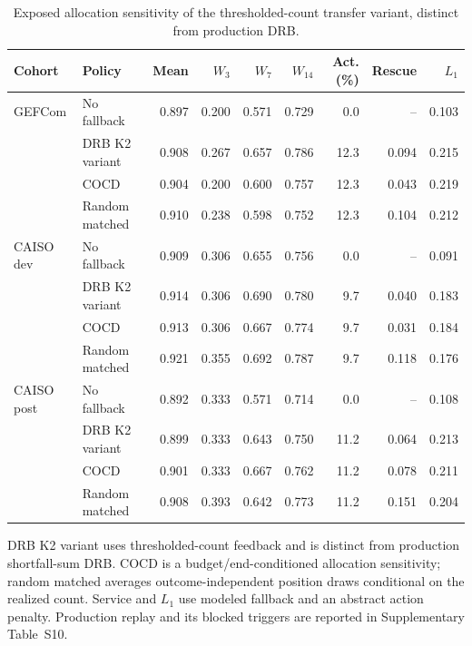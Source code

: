 
\begin{table}[!tbp]
\centering
\caption{Exposed allocation sensitivity of the thresholded-count
transfer variant, distinct from production DRB.}
\label{tab:transfer}
\scriptsize
\setlength{\tabcolsep}{2.5pt}
\begin{tabular}{llrrrrrrr}
\toprule
Cohort & Policy & Mean & $W_3$ & $W_7$ & $W_{14}$ & Act. (\%) & Rescue & $L_1$ \\
\midrule
GEFCom & No fallback & 0.897 & 0.200 & 0.571 & 0.729 & 0.0 & -- & 0.103 \\
 & DRB K2 variant & 0.908 & 0.267 & 0.657 & 0.786 & 12.3 & 0.094 & 0.215 \\
 & COCD & 0.904 & 0.200 & 0.600 & 0.757 & 12.3 & 0.043 & 0.219 \\
 & Random matched & 0.910 & 0.238 & 0.598 & 0.752 & 12.3 & 0.104 & 0.212 \\
\addlinespace[2pt]
CAISO dev & No fallback & 0.909 & 0.306 & 0.655 & 0.756 & 0.0 & -- & 0.091 \\
 & DRB K2 variant & 0.914 & 0.306 & 0.690 & 0.780 & 9.7 & 0.040 & 0.183 \\
 & COCD & 0.913 & 0.306 & 0.667 & 0.774 & 9.7 & 0.031 & 0.184 \\
 & Random matched & 0.921 & 0.355 & 0.692 & 0.787 & 9.7 & 0.118 & 0.176 \\
\addlinespace[2pt]
CAISO post & No fallback & 0.892 & 0.333 & 0.571 & 0.714 & 0.0 & -- & 0.108 \\
 & DRB K2 variant & 0.899 & 0.333 & 0.643 & 0.750 & 11.2 & 0.064 & 0.213 \\
 & COCD & 0.901 & 0.333 & 0.667 & 0.762 & 11.2 & 0.078 & 0.211 \\
 & Random matched & 0.908 & 0.393 & 0.642 & 0.773 & 11.2 & 0.151 & 0.204 \\
\bottomrule
\end{tabular}
\par\footnotesize DRB K2 variant uses thresholded-count feedback and is distinct from production shortfall-sum DRB. COCD is a budget/end-conditioned allocation sensitivity; random matched averages outcome-independent position draws conditional on the realized count. Service and $L_1$ use modeled fallback and an abstract action penalty. Production replay and its blocked triggers are reported in Supplementary Table~S10.
\end{table}
